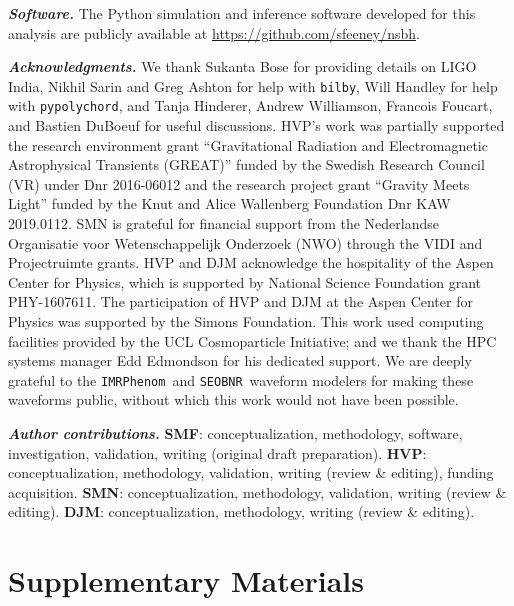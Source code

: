\documentclass[%
 reprint,
 superscriptaddress,
 nofootinbib,
 amsmath,amssymb,
 aps,
]{revtex4-2}
\newcommand{\seobnr}{\texttt{SEOBNR}}
\newcommand{\imrp}{\texttt{IMRPhenom}}
\begin{document}
\textbf{\emph{Software.}} The Python simulation and inference software developed for this analysis are publicly available at \url{https://github.com/sfeeney/nsbh}.


\textbf{\emph{Acknowledgments.}} We thank Sukanta Bose for providing details on LIGO India, Nikhil Sarin and Greg Ashton for help with \texttt{bilby}, Will Handley for help with \texttt{pypolychord}, and Tanja Hinderer, Andrew Williamson, Francois Foucart, and Bastien DuBoeuf for useful discussions. HVP's work was partially supported the research environment grant ``Gravitational Radiation and Electromagnetic Astrophysical Transients (GREAT)'' funded by the Swedish Research Council (VR) under Dnr 2016-06012 and the research project grant ``Gravity Meets Light'' funded by the Knut and Alice Wallenberg Foundation Dnr KAW 2019.0112. SMN is grateful for financial support from the Nederlandse Organisatie voor Wetenschappelijk Onderzoek (NWO) through the VIDI and Projectruimte grants. HVP and DJM acknowledge the hospitality of the Aspen Center for Physics, which is supported by National Science Foundation grant PHY-1607611. The participation of HVP and DJM at the Aspen Center for Physics was supported by the Simons Foundation. This work used computing facilities provided by the UCL Cosmoparticle Initiative; and we thank the HPC systems manager Edd Edmondson for his dedicated support. We are deeply grateful to the \imrp\ and \seobnr\ waveform modelers for making these waveforms public, without which this work would not have been possible.

\textbf{\emph{Author contributions.}} {\bf SMF}: conceptualization, methodology, software, investigation, validation, writing (original draft preparation). {\bf HVP}: conceptualization, methodology, validation, writing (review \& editing), funding acquisition. {\bf SMN}: conceptualization, methodology, validation, writing (review \& editing). {\bf DJM}: conceptualization, methodology, writing (review \& editing).


\appendix

\section{Supplementary Materials}
\end{document}
